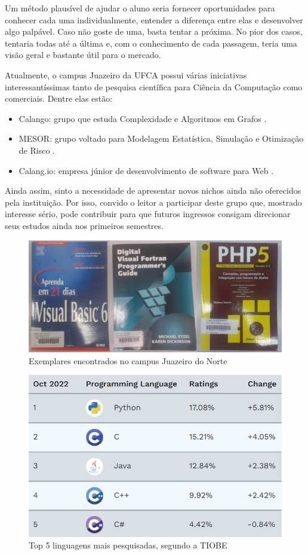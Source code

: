 \documentclass[12pt]{article}
\begin{document}
\begin{multicols}{2}
    Um método plausível de ajudar o aluno seria fornecer oportunidades para conhecer cada uma individualmente, entender a diferença entre elas e desenvolver algo palpável. Caso não goste de uma, basta tentar a próxima. No pior dos casos, tentaria todas até a última e, com o conhecimento de cada passagem, teria uma visão geral e bastante útil para o mercado. 

    Atualmente, o campus Juazeiro da UFCA possui várias iniciativas interessantíssimas tanto de pesquisa científica para Ciência da Computação como comerciais. Dentre elas estão:
    
    \begin{itemize}
        \item Calango: grupo que estuda Complexidade e Algoritmos em Grafos \cite{grupo-calango}.
        \item MESOR: grupo voltado para Modelagem Estatística, Simulação e Otimização de Risco \cite{grupo-mesor}.
        \item Calang.io: empresa júnior de desenvolvimento de software para Web \cite{calang-io}.
    \end{itemize}

    Ainda assim, sinto a necessidade de apresentar novos nichos ainda não oferecidos pela instituição. Por isso, convido o leitor a participar deste grupo que, mostrado interesse sério, pode contribuir para que futuros ingressos consigam direcionar seus estudos ainda nos primeiros semestres.
    
\end{multicols}

\begin{figure}[t]
        \centering
        \includegraphics[width=0.6\linewidth]{img/livros.png}
        \caption{Exemplares encontrados no campus Juazeiro do Norte}
        \label{fig:livros}
    \end{figure}
\begin{figure}[t]
        \centering
        \includegraphics[width=0.6\linewidth]{img/top5.png}
        \caption{Top 5 linguagens mais pesquisadas, segundo a TIOBE}
        \label{fig:top5}
\end{figure}
\end{document}
